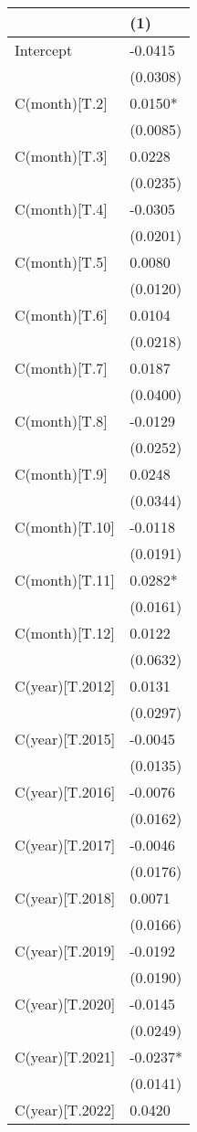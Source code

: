 \begin{tabular}{ll}
\toprule
 & (1) \\
\midrule
Intercept & -0.0415 \\
 & (0.0308) \\
C(month)[T.2] & 0.0150* \\
 & (0.0085) \\
C(month)[T.3] & 0.0228 \\
 & (0.0235) \\
C(month)[T.4] & -0.0305 \\
 & (0.0201) \\
C(month)[T.5] & 0.0080 \\
 & (0.0120) \\
C(month)[T.6] & 0.0104 \\
 & (0.0218) \\
C(month)[T.7] & 0.0187 \\
 & (0.0400) \\
C(month)[T.8] & -0.0129 \\
 & (0.0252) \\
C(month)[T.9] & 0.0248 \\
 & (0.0344) \\
C(month)[T.10] & -0.0118 \\
 & (0.0191) \\
C(month)[T.11] & 0.0282* \\
 & (0.0161) \\
C(month)[T.12] & 0.0122 \\
 & (0.0632) \\
C(year)[T.2012] & 0.0131 \\
 & (0.0297) \\
C(year)[T.2015] & -0.0045 \\
 & (0.0135) \\
C(year)[T.2016] & -0.0076 \\
 & (0.0162) \\
C(year)[T.2017] & -0.0046 \\
 & (0.0176) \\
C(year)[T.2018] & 0.0071 \\
 & (0.0166) \\
C(year)[T.2019] & -0.0192 \\
 & (0.0190) \\
C(year)[T.2020] & -0.0145 \\
 & (0.0249) \\
C(year)[T.2021] & -0.0237* \\
 & (0.0141) \\
C(year)[T.2022] & 0.0420 \\

\end{tabular}
